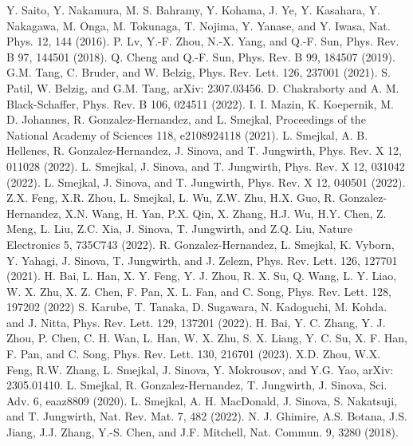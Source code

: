 \documentclass[aps, prb, twocolumn, amssymb, amsmath, showpacs, superscriptaddress]{revtex4-1}
\begin{document}
\begin{thebibliography}{00}
Y. Saito, Y. Nakamura, M. S. Bahramy, Y. Kohama, J. Ye, Y.
Kasahara, Y. Nakagawa, M. Onga, M. Tokunaga, T. Nojima,
Y. Yanase, and Y. Iwasa, Nat. Phys. 12, 144 (2016). %
P. Lv, Y.-F. Zhou, N.-X. Yang, and Q.-F. Sun, Phys. Rev. B 97, 144501 (2018). %
Q. Cheng and Q.-F. Sun, Phys. Rev. B 99, 184507 (2019). %
G.M. Tang, C. Bruder, and W. Belzig, Phys. Rev. Lett. 126, 237001 (2021).
S. Patil, W. Belzig, and G.M. Tang, arXiv: 2307.03456.
D. Chakraborty and A. M. Black-Schaffer, Phys. Rev. B 106, 024511 (2022).
I. I. Mazin, K. Koepernik, M. D. Johannes, R. Gonzalez-Hernandez, and L. Smejkal, Proceedings of the National Academy of Sciences 118, e2108924118 (2021).
L. Smejkal, A. B. Hellenes, R. Gonzalez-Hernandez, J. Sinova, and T. Jungwirth, Phys. Rev. X 12, 011028 (2022).
L. Smejkal, J. Sinova, and T. Jungwirth, Phys. Rev. X 12, 031042 (2022).
L. Smejkal, J. Sinova, and T. Jungwirth, Phys. Rev. X 12, 040501 (2022).
Z.X. Feng, X.R. Zhou, L. Smejkal, L. Wu, Z.W. Zhu, H.X. Guo, R. Gonzalez-Hernandez, X.N. Wang, H. Yan, P.X. Qin, X. Zhang, H.J. Wu, H.Y. Chen, Z. Meng, L. Liu, Z.C. Xia, J. Sinova, T. Jungwirth, and Z.Q. Liu, Nature Electronics 5, 735C743 (2022).
R. Gonzalez-Hernandez, L. Smejkal, K. Vyborn, Y. Yahagi, J. Sinova,  T. Jungwirth, and J. Zelezn, Phys. Rev. Lett. 126, 127701 (2021).
H. Bai, L. Han, X. Y. Feng, Y. J. Zhou, R. X. Su, Q. Wang, L. Y. Liao, W. X. Zhu, X. Z. Chen, F. Pan, X. L. Fan, and C. Song, Phys. Rev. Lett. 128, 197202 (2022)
S. Karube, T. Tanaka, D. Sugawara, N. Kadoguchi, M. Kohda. and J. Nitta, Phys. Rev. Lett. 129, 137201 (2022).
H. Bai, Y. C. Zhang, Y. J. Zhou, P. Chen, C. H. Wan, L. Han, W. X. Zhu, S. X. Liang, Y. C. Su, X. F. Han, F. Pan, and C. Song, Phys. Rev. Lett. 130, 216701 (2023).
X.D. Zhou, W.X. Feng, R.W. Zhang, L. Smejkal, J. Sinova, Y. Mokrousov, and Y.G. Yao, arXiv: 2305.01410.
L. Smejkal, R. Gonzalez-Hernandez, T. Jungwirth, J. Sinova, Sci. Adv. 6, eaaz8809 (2020).
L. Smejkal, A. H. MacDonald, J. Sinova, S. Nakatsuji, and T. Jungwirth, Nat. Rev. Mat. 7, 482 (2022).
N. J. Ghimire, A.S. Botana, J.S. Jiang, J.J. Zhang, Y.-S. Chen, and J.F. Mitchell, Nat. Commun. 9, 3280 (2018).

\end{thebibliography}
\end{document}
